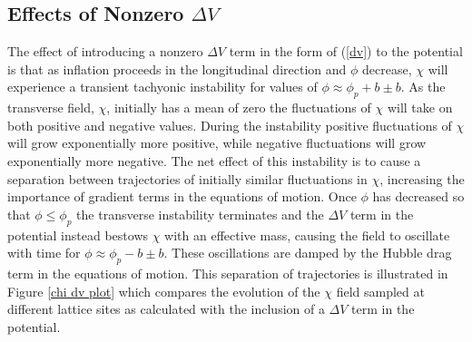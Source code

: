 \documentclass[letterpaper,11pt]{article}
\begin{document}


\subsection{Effects of Nonzero $\Delta V$}
The effect of introducing a nonzero $\Delta V$ term in the form of (\ref{dv}) to the potential is that as inflation proceeds in the longitudinal direction and $\phi$ decrease, $\chi$ will experience a transient tachyonic instability for values of $\phi \approx \phi_p+b \pm b$. As the transverse field, $\chi$, initially has a mean of zero the fluctuations of $\chi$ will take on both positive and negative values. During the instability positive fluctuations of $\chi$ will grow exponentially more positive, while negative fluctuations will grow exponentially more negative. The net effect of this instability is to cause a separation between trajectories of initially similar fluctuations in $\chi$, increasing the importance of gradient terms in the equations of motion. Once $\phi$ has decreased so that $\phi \leq \phi_p$ the transverse instability terminates and the $\Delta V$ term in the potential instead bestows $\chi$ with an effective mass, causing the field to oscillate with time for $\phi \approx \phi_p-b \pm b$. These oscillations are damped by the Hubble drag term in the equations of motion. This separation of trajectories is illustrated in Figure \ref{chi dv plot} which compares the evolution of the $\chi$ field sampled at different lattice sites as calculated with the inclusion of a $\Delta V$ term in the potential.
\end{document}

